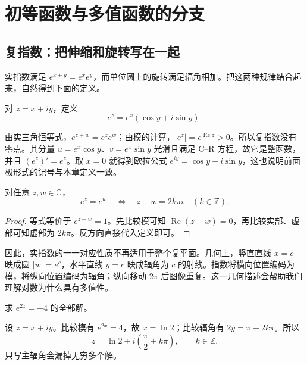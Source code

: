 \setcounter{chapter}{3} %
\chapter{初等函数与多值函数的分支}
\label{chap:ca-elementary}

\section{复指数：把伸缩和旋转写在一起}

实指数满足 $e^{x+y}=e^xe^y$，而单位圆上的旋转满足辐角相加。把这两种规律结合起来，自然得到下面的定义。

\begin{definition}[复指数函数]
对 $z=x+iy$，定义
\begin{equation}
 e^z=e^x(\cos y+i\sin y).
 \label{eq:ca-exp}
\end{equation}
\end{definition}

由实三角恒等式，$e^{z+w}=e^ze^w$；由模的计算，$|e^z|=e^{\operatorname{Re}z}>0$。所以复指数没有零点。其分量 $u=e^x\cos y$、$v=e^x\sin y$ 光滑且满足 C--R 方程，故它是整函数，并且 $(e^z)'=e^z$。取 $x=0$ 就得到欧拉公式 $e^{iy}=\cos y+i\sin y$，这也说明前面极形式的记号与本章定义一致。

\begin{proposition}[复指数的周期与相等条件]
对任意 $z,w\in\mathbb C$，
\[
 e^z=e^w\quad\Longleftrightarrow\quad z-w=2k\pi i\quad(k\in\mathbb Z).
\]
\end{proposition}
\begin{proof}
等式等价于 $e^{z-w}=1$。先比较模可知 $\operatorname{Re}(z-w)=0$，再比较实部、虚部可知虚部为 $2k\pi$。反方向直接代入定义即可。
\end{proof}

因此，实指数的一一对应性质不再适用于整个复平面。几何上，竖直直线 $x=c$ 映成圆 $|w|=e^c$，水平直线 $y=c$ 映成辐角为 $c$ 的射线。指数将横向位置编码为模，将纵向位置编码为辐角；纵向移动 $2\pi$ 后图像重复。这一几何描述会帮助我们理解对数为什么具有多值性。

\begin{example}[解指数方程]
求 $e^{2z}=-4$ 的全部解。
\end{example}
\begin{solve}
设 $z=x+iy$。比较模有 $e^{2x}=4$，故 $x=\ln2$；比较辐角有 $2y=\pi+2k\pi$。所以
\[
 z=\ln2+i\left(\frac\pi2+k\pi\right),\qquad k\in\mathbb Z.
\]
只写主辐角会漏掉无穷多个解。
\end{solve}

